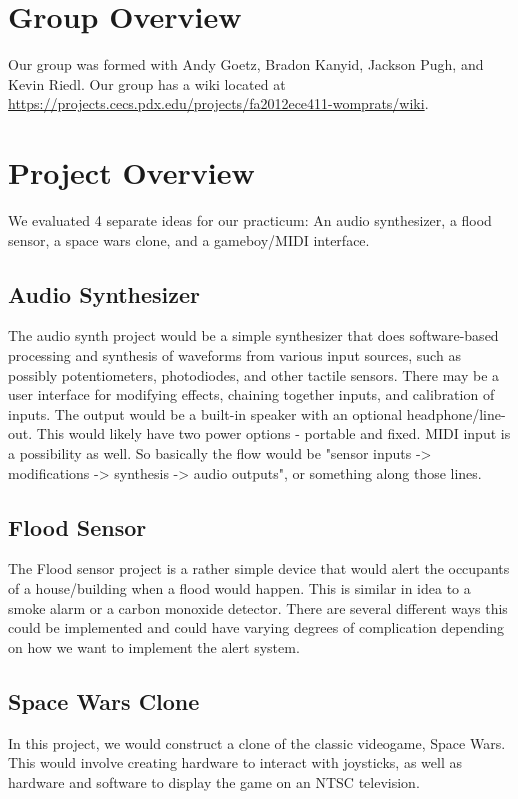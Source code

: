 \documentclass{article}
\begin{document}
\newenvironment{frcseries}{\fontfamily{frc}\selectfont}{}
\newcommand{\textfrc}[1]{{\frcseries#1}}
\newcommand{\mathfrc}[1]{\text{\textfrc{#1}}}


\section{Group Overview}
Our group was formed with Andy Goetz, Bradon Kanyid, Jackson Pugh, and
Kevin Riedl. Our group has a wiki located at \url{https://projects.cecs.pdx.edu/projects/fa2012ece411-womprats/wiki}.
\section{Project Overview}

We evaluated 4 separate ideas for our practicum: An audio synthesizer,
a flood sensor, a space wars clone, and a gameboy/MIDI interface.

\subsection{Audio Synthesizer}
The audio synth project would be a simple synthesizer that does
software-based processing and synthesis of waveforms from various
input sources, such as possibly potentiometers, photodiodes, and other
tactile sensors. There may be a user interface for modifying effects,
chaining together inputs, and calibration of inputs. The output would
be a built-in speaker with an optional headphone/line-out. This would
likely have two power options - portable and fixed. MIDI input is a
possibility as well. So basically the flow would be "sensor inputs ->
modifications -> synthesis -> audio outputs", or something along those
lines.
\subsection{Flood Sensor}
The Flood sensor project is a rather simple device that would alert
the occupants of a house/building when a flood would happen. This is
similar in idea to a smoke alarm or a carbon monoxide detector. There
are several different ways this could be implemented and could have
varying degrees of complication depending on how we want to implement
the alert system.
\subsection{Space Wars Clone}
In this project, we would construct a clone of the classic videogame,
Space Wars. This would involve creating hardware to interact with
joysticks, as well as hardware and software to display the game on an
NTSC television. 
\end{document}
